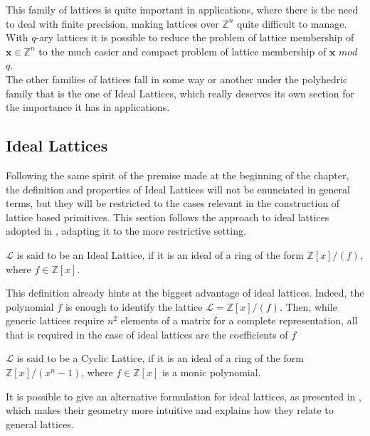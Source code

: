 This family of lattices is quite important in applications, where there is the need to deal with finite precision, making lattices over $\mathbb{Z}^n$ quite difficult to manage. With $q$-ary lattices it is possible to reduce the problem of lattice membership of $\mathbf{x}\in\mathbb{Z}^n$ to the much easier and compact problem of lattice membership of $\mathbf{x}$ $mod$ $q$.\\
The other families of lattices fall in some way or another under the polyhedric family that is the one of Ideal Lattices, which really deserves its own section for the importance it has in applications.

\subsection{Ideal Lattices}\label{sec:bg:ideal}

Following the same spirit of the premise made at the beginning of the chapter, the definition and properties of Ideal Lattices will not be enunciated in general terms, but they will be restricted to the cases relevant in the construction of lattice based primitives. This section follows the approach to ideal lattices adopted in \cite{ideal_lattices}, adapting it to the more restrictive setting.

\begin{definition}
$\mathscr{L}$ is said to be an Ideal Lattice, if it is an ideal of a ring of the form $\mathbb{Z}[x]/(f)$, where $f\in\mathbb{Z}[x]$.\\
\end{definition}

This definition already hints at the biggest advantage of ideal lattices. Indeed, the polynomial $f$ is enough to identify the lattice $\mathscr{L}=\mathbb{Z}[x]/(f)$. Then, while generic lattices require $n^2$ elements of a matrix for a complete representation, all that is required in the case of ideal lattices are the coefficients of $f$\\

\begin{definition}
$\mathscr{L}$ is said to be a Cyclic Lattice, if it is an ideal of a ring of the form $\mathbb{Z}[x]/(x^n-1)$, where $f\in\mathbb{Z}[x]$ is a monic polynomial.\\
\end{definition}

It is possible to give an alternative formulation for ideal lattices, as presented in \cite{PQC}, which makes their geometry more intuitive and explains how they relate to general lattices.

